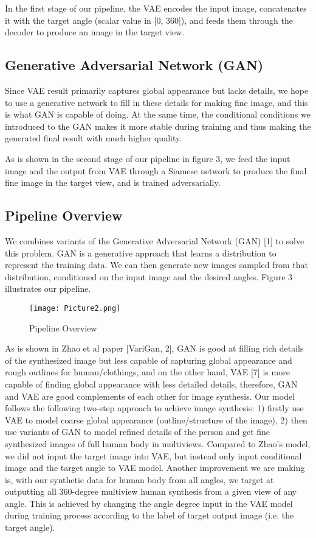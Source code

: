 \documentclass[10pt,conference]{IEEEtran}
\begin{document}
In the first stage of our pipeline, the VAE encodes the input image, concatenates it with the target angle (scalar value in [0, 360]), and feeds them through the decoder to produce an image in the target view.


\subsection{Generative Adversarial Network (GAN)}

Since VAE result primarily captures global appearance but lacks details, we hope to use a generative network to fill in these details for making fine image, and this is what GAN is capable of doing. At the same time, the conditional conditions we introduced to the GAN makes it more stable during training and thus making the generated final result with much higher quality.

As is shown in the second stage of our pipeline in figure 3, we feed the input image and the output from VAE through a Siamese network to produce the final fine image in the target view, and is trained adversarially.

\subsection{Pipeline Overview}
We combines variants of the Generative Adversarial Network (GAN) [1] to solve this problem. GAN is a generative approach that learns a distribution to represent the training data. We can then generate new images sampled from that distribution, conditioned on the input image and the desired angles. Figure 3 illustrates our pipeline.

\begin{figure*}[htbp]
\centering
\texttt{[image: Picture2.png]}
\caption{Pipeline Overview}
\end{figure*}

As is shown in Zhao et al paper [VariGan, 2], GAN is good at filling rich details of the synthesized image but less capable of capturing global appearance and rough outlines for human/clothings, and on the other hand, VAE [7] is more capable of finding global appearance with less detailed details, therefore, GAN and VAE are good complements of each other for image synthesis. Our model follows the following two-step approach to achieve image synthesis: 1) firstly use VAE to model coarse global appearance (outline/structure of the image), 2) then use variants of GAN to model refined details of the person and get fine synthesized images of full human body in multiviews. Compared to Zhao's model, we did not input the target image into VAE, but instead only input conditional image and the target angle to VAE model. Another improvement we are making is, with our synthetic data for human body from all angles, we target at outputting all 360-degree multiview human synthesis from a given view of any angle. This is achieved by changing the angle degree input in the VAE model during training process according to the label of target output image (i.e. the target angle). 
\end{document}
